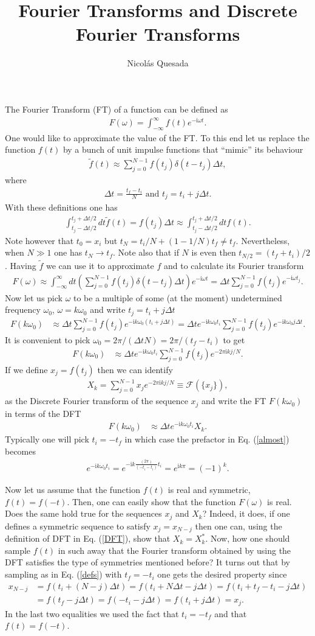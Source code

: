 \documentclass[11pt,letterpaper]{article}
\title{Fourier Transforms and Discrete Fourier Transforms}
\author{Nicol\'as Quesada}
\newcommand{\ii}{\mathrm{i}}
\newcommand{\eq}[1]{\begin{align}#1\end{align}}
\begin{document}
\maketitle
The Fourier Transform (FT) of a function can be defined as
\eq{
F(\omega)=\int_{-\infty}^\infty f(t) e^{-\ii \omega t}.
}
One would like to approximate the value of the FT. To this end let us replace the function $f(t)$ by a bunch of unit impulse functions that ``mimic'' its behaviour 
\eq{
\tilde f(t) \approx \sum_{j=0}^{N-1} f(t_j) \delta(t-t_j) \Delta t,
}
where 
\eq{\label{defs}
\Delta t=\frac{t_f-t_i}{N} \text{ and } t_j=t_i+j \Delta t.
}
With these definitions one has
\eq{
\int_{t_j-\Delta t/2}^{t_j+\Delta t/2} dt \tilde f(t) = f(t_j) \Delta t \approx \int_{t_j-\Delta t/2}^{t_j+\Delta t/2} dt f(t).
}
Note however that $t_0=x_i$ but $t_N=t_i/N+(1-1/N) t_f \neq t_f$. Nevertheless, when $N \gg 1$ one has $t_N \to t_f$. Note also that if $N$ is even then $t_{N/2}=(t_f+t_i)/2$. 
Having $\tilde f$ we can use it to approximate $f$ and to calculate its Fourier transform
\eq{
F(\omega) \approx \int_{-\infty}^\infty dt \left(\sum_{j=0}^{N-1} f(t_j) \delta(t-t_j) \Delta t \right) e^{-\ii \omega t}=\Delta t \sum_{j=0}^{N-1} f(t_j) e^{-\ii \omega t_j}.
}
Now let us pick $\omega$ to be a multiple of some (at the moment) undetermined frequency $\omega_0$, $\omega=k \omega_0$ and write $t_j=t_i+j \Delta t$
\eq{
F(k \omega_0)&\approx \Delta t\sum_{j=0}^{N-1} f(t_j) e^{-\ii k \omega_0 (t_i+j \Delta t)}=\Delta t e^{-\ii k \omega_0 t_i}\sum_{j=0}^{N-1} f(t_j) e^{-\ii k \omega_0 j \Delta t}.
}
It is convenient to pick $\omega_0 = 2 \pi/(\Delta t N)=2 \pi /(t_f-t_i)$ to get
\eq{\label{almost}
F(k \omega_0)&\approx \Delta t e^{-\ii k \omega_0 t_i}\sum_{j=0}^{N-1} f(t_j) e^{-2 \pi \ii k  j/N}.
}
If we define $x_j=f(t_j)$ then we can identify
\eq{\label{DFT}
X_k=\sum_{j=0}^{N-1} x_j e^{-2 \pi \ii k  j/N}\equiv \mathcal{F}\left(\{x_j \}\right),
}
as the Discrete Fourier transform of the sequence $x_j$ and write the FT  $F(k \omega_0)$ in terms of the DFT
\eq{\label{quasi}
F(k \omega_0)&\approx \Delta t e^{-\ii k \omega_0 t_i} X_k.
}
Typically one will pick $t_i=-t_f$ in which case the prefactor in Eq. (\ref{almost}) becomes
\eq{
e^{-\ii k \omega_0 t_i}=e^{-\ii k \frac{(2 \pi)}{(-t_i-t_i)} t_i}=e^{\ii k \pi}=(-1)^k.
}

Now let us assume that the function $f(t)$ is real and symmetric, $f(t)=f(-t)$. Then, one can easily show that the function $F(\omega)$ is real. Does the same hold true for the sequences $x_j$ and $X_k$? Indeed, it does, if one defines a symmetric sequence to satisfy $x_j=x_{N-j}$ then one can, using the definition of DFT in Eq. (\ref{DFT}), show that $X_k=X_k^*$. Now, how one should sample $f(t)$ in such away that the Fourier transform obtained by using the DFT satisfies the type of symmetries mentioned before?
It turns out that by sampling as in Eq. (\ref{defs}) with $t_f=-t_i$ one gets the desired property since
\eq{
x_{N-j}&=f(t_i+(N-j)\Delta t)=f(t_i+N\Delta t-j\Delta t)=f(t_i+t_f-t_i-j \Delta t  )\\
&=f(t_f-j\Delta t )=f(-t_i-j \Delta t )=f(t_i+j \Delta t )=x_j. \nonumber
}
In the last two equalities we used the fact that $t_i=-t_f$ and that $f(t)=f(-t)$.
\end{document}
